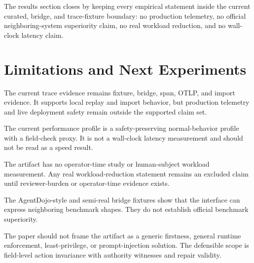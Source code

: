 \documentclass[11pt]{article}
\begin{document}
The results section closes by keeping every empirical statement inside the current curated, bridge, and trace-fixture boundary: no production telemetry, no official neighboring-system superiority claim, no real workload reduction, and no wall-clock latency claim.

\section{Limitations and Next Experiments}

The current trace evidence remains fixture, bridge, span, OTLP, and import evidence. It supports local replay and import behavior, but production telemetry and live deployment safety remain outside the supported claim set.

The current performance profile is a safety-preserving normal-behavior profile with a field-check proxy. It is not a wall-clock latency measurement and should not be read as a speed result.

The artifact has no operator-time study or human-subject workload measurement. Any real workload-reduction statement remains an excluded claim until reviewer-burden or operator-time evidence exists.

The AgentDojo-style and semi-real bridge fixtures show that the interface can express neighboring benchmark shapes. They do not establish official benchmark superiority.

The paper should not frame the artifact as a generic firstness, general runtime enforcement, least-privilege, or prompt-injection solution. The defensible scope is field-level action invariance with authority witnesses and repair validity.
\end{document}
